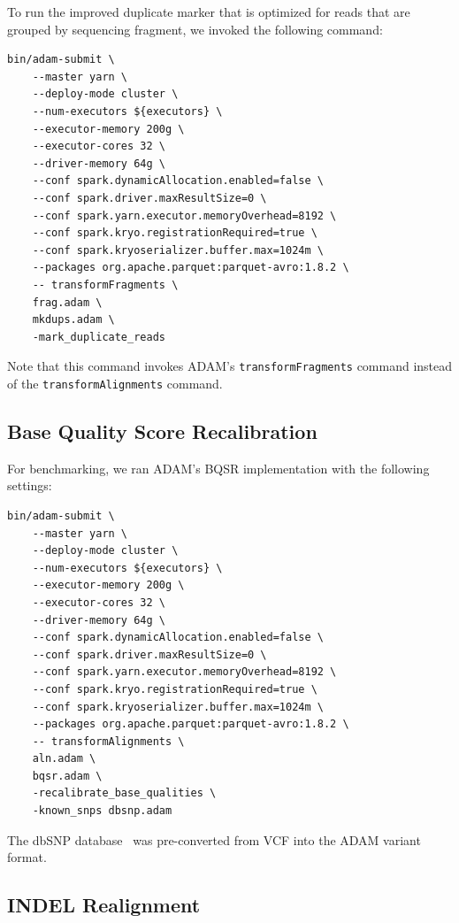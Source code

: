 \documentclass[phd]{ucbthesis}
\begin{document}
To run the improved duplicate marker that is optimized for reads that are
grouped by sequencing fragment, we invoked the following command:

\begin{lstlisting}[caption=ADAM Fragment Duplicate Marking Command]
bin/adam-submit \
    --master yarn \
    --deploy-mode cluster \
    --num-executors ${executors} \
    --executor-memory 200g \
    --executor-cores 32 \
    --driver-memory 64g \
    --conf spark.dynamicAllocation.enabled=false \
    --conf spark.driver.maxResultSize=0 \
    --conf spark.yarn.executor.memoryOverhead=8192 \
    --conf spark.kryo.registrationRequired=true \
    --conf spark.kryoserializer.buffer.max=1024m \
    --packages org.apache.parquet:parquet-avro:1.8.2 \
    -- transformFragments \
    frag.adam \
    mkdups.adam \
    -mark_duplicate_reads
\end{lstlisting}

Note that this command invokes ADAM's \texttt{transformFragments} command
instead of the \texttt{transformAlignments} command.

\subsection{Base Quality Score Recalibration}
\label{sec:adam-bqsr}

For benchmarking, we ran ADAM's BQSR implementation with the following settings:

\begin{lstlisting}[caption=ADAM BQSR Command]
bin/adam-submit \
    --master yarn \
    --deploy-mode cluster \
    --num-executors ${executors} \
    --executor-memory 200g \
    --executor-cores 32 \
    --driver-memory 64g \
    --conf spark.dynamicAllocation.enabled=false \
    --conf spark.driver.maxResultSize=0 \
    --conf spark.yarn.executor.memoryOverhead=8192 \
    --conf spark.kryo.registrationRequired=true \
    --conf spark.kryoserializer.buffer.max=1024m \
    --packages org.apache.parquet:parquet-avro:1.8.2 \
    -- transformAlignments \
    aln.adam \
    bqsr.adam \
    -recalibrate_base_qualities \
    -known_snps dbsnp.adam
\end{lstlisting}

The dbSNP database~\cite{sherry01} was pre-converted from VCF into the ADAM
variant format.

\subsection{INDEL Realignment}
\label{sec:adam-ir}
\end{document}
